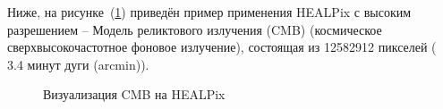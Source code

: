 \documentclass[14pt]{article} %
\begin{document}
Ниже, на рисунке~(\ref{img:cmb}) приведён пример применения HEALPix с высоким разрешением -- Модель реликтового излучения (CMB) (космическое сверхвысокочастотное фоновое излучение), состоящая из 12582912 пикселей (~ 3.4 минут дуги (arcmin)).


\begin{figure}[h]
\begin{minipage}[h]{0.3\linewidth}
\end{minipage}
\hfill
\begin{minipage}[h]{0.69\linewidth}
\end{minipage}
\caption{Визуализация CMB на HEALPix}
\label{img:cmb}
\end{figure}
\end{document}
